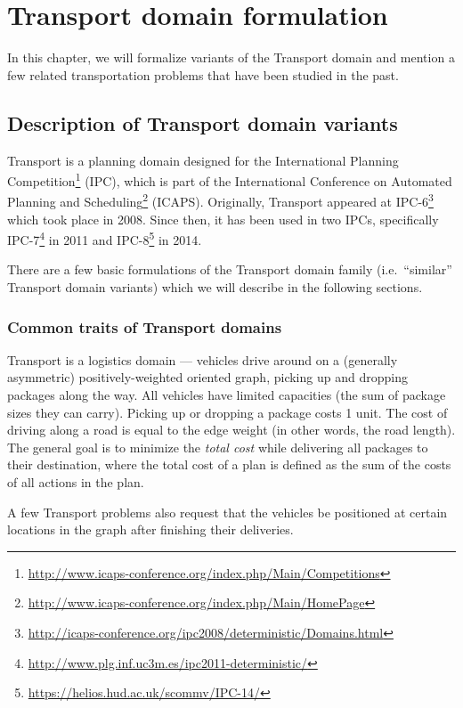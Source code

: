 \chapter{Transport domain formulation}

In this chapter, we will formalize variants of the Transport domain and mention a few related transportation problems that have been studied in the past.

\section{Description of Transport domain variants}\label{domain-desc}

Transport is a planning domain designed for
the International Planning
Competition\footnote{\url{http://www.icaps-conference.org/index.php/Main/Competitions}}
(IPC), which is part of the International Conference on Automated Planning and
Scheduling\footnote{\url{http://www.icaps-conference.org/index.php/Main/HomePage}} (ICAPS).
Originally, Transport appeared at 
IPC-6\footnote{\url{http://icaps-conference.org/ipc2008/deterministic/Domains.html}} which took place in 2008.
Since then, it has been used in two IPCs,
specifically IPC-7\footnote{\url{http://www.plg.inf.uc3m.es/ipc2011-deterministic/}} in 2011
and IPC-8\footnote{\url{https://helios.hud.ac.uk/scommv/IPC-14/}} in 2014.

There are a few basic formulations of the Transport domain family (i.e.~``similar'' Transport domain variants) which we will describe in the following sections.

\subsection{Common traits of Transport domains}

Transport is a logistics domain --- vehicles drive around on a (generally asymmetric) positively-weighted oriented graph, picking up and dropping packages along the way.
All vehicles have limited capacities (the sum of package sizes they can carry).
Picking up or dropping a package costs 1 unit. The cost of driving along a road is equal to the edge weight
(in other words, the road length).
The general goal is to minimize the \textit{total cost}
while delivering all packages to their destination, where
the total cost of a plan is defined as the sum of the costs of all actions in
the plan.

A few Transport problems also request that the vehicles be positioned at certain
locations in the graph
after finishing their deliveries.

